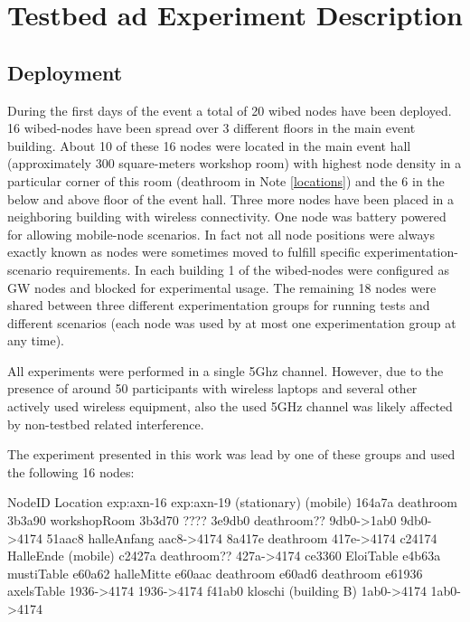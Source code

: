 \documentclass[a4paper,12pt,twoside]{article}
\begin{document}
\section{Testbed ad Experiment Description}

\subsection{Deployment}

During the first days of the event a total of 20 wibed nodes have been
deployed. 16 wibed-nodes have been spread over 3 different floors in
the main event building. About 10 of these 16 nodes were located in
the main event hall (approximately 300 square-meters workshop room)
with highest node density in a particular corner of this room
(deathroom in Note \ref{locations}) and the 6 in the below and above floor of the event
hall. Three more nodes have been placed in a neighboring building with
wireless connectivity.  One node was battery powered for allowing
mobile-node scenarios.  In fact not all node positions were always
exactly known as nodes were sometimes moved to fulfill specific
experimentation-scenario requirements.  In each building 1 of the
wibed-nodes were configured as GW nodes and blocked for experimental
usage. The remaining 18 nodes were shared between three different
experimentation groups for running tests and different scenarios (each
node was used by at most one experimentation group at any time).

All experiments were performed in a single 5Ghz channel. However, due
to the presence of around 50 participants with wireless laptops and
several other actively used wireless equipment, also the used 5GHz
channel was likely affected by non-testbed related interference.

The experiment presented in this work was lead by one of these groups
and used the following 16 nodes:

\begin{rawtext}[caption={Node locations and experiment usage}, label=locations]
NodeID  Location               exp:axn-16   exp:axn-19
                               (stationary) (mobile)
164a7a  deathroom
3b3a90  workshopRoom
3b3d70  ????
3e9db0  deathroom??            9db0->1ab0  9db0->4174
51aac8  halleAnfang                        aac8->4174
8a417e  deathroom              417e->4174   
c24174  HalleEnde (mobile)                  
c2427a  deathroom??                        427a->4174
ce3360  EloiTable
e4b63a  mustiTable
e60a62  halleMitte
e60aac  deathroom
e60ad6  deathroom
e61936  axelsTable             1936->4174  1936->4174
f41ab0  kloschi (building B)   1ab0->4174  1ab0->4174
\end{rawtext}
\end{document}
